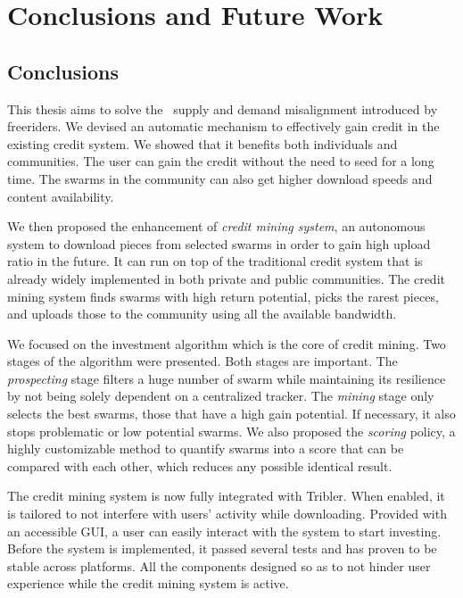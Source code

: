 \chapter{Conclusions and Future Work}
\label{chp:conclusionsandfuturework}

\section{Conclusions}
This thesis aims to solve the \bt~supply and demand misalignment introduced by freeriders. We devised an automatic mechanism to effectively gain credit in the existing credit system. We showed that it benefits both individuals and communities. The user can gain the credit without the need to seed for a long time. The swarms in the community can also get higher download speeds and content availability.

We then proposed the enhancement of \textit{credit mining system}, an autonomous system to download pieces from selected swarms in order to gain high upload ratio in the future. It can run on top of the traditional credit system that is already widely implemented in both private and public communities. The credit mining system finds swarms with high return potential, picks the rarest pieces, and uploads those to the community using all the available bandwidth.

We focused on the investment algorithm which is the core of credit mining. Two stages of the algorithm were presented. Both stages are important. The \textit{prospecting} stage filters a huge number of swarm while maintaining its resilience by not being solely dependent on a centralized tracker. The \textit{mining} stage only selects the best swarms, those that have a high gain potential. If necessary, it also stops problematic or low potential swarms. We also proposed the \textit{scoring} policy, a highly customizable method to quantify swarms into a score that can be compared with each other, which reduces any possible identical result.

The credit mining system is now fully integrated with Tribler. When enabled, it is tailored to not interfere with users' activity while downloading. Provided with an accessible GUI, a user can easily interact with the system to start investing. Before the system is implemented, it passed several tests and has proven to be stable across platforms. All the components designed so as to not hinder user experience while the credit mining system is active.

